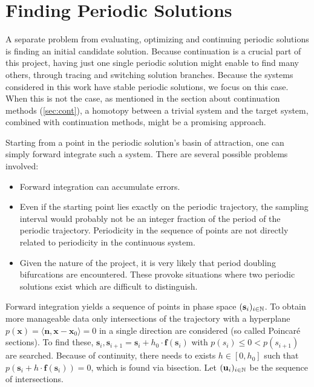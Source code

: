 \section{Finding Periodic Solutions}
\label{sec:initial}

A separate problem from evaluating, optimizing and continuing periodic solutions is finding an initial candidate solution.
Because continuation is a crucial part of this project, having just one single periodic solution might enable to find many others, through tracing and switching solution branches.
Because the systems considered in this work have stable periodic solutions, we focus on this case.
When this is not the case, as mentioned in the section about continuation methods (\autoref{sec:cont}), a homotopy between a trivial system and the target system, combined with continuation methods, might be a promising approach.

Starting from a point in the periodic solution's basin of attraction, one can simply forward integrate such a system.
There are several possible problems involved:
\begin{itemize}
	\item Forward integration can accumulate errors.
	\item Even if the starting point lies exactly on the periodic trajectory, the sampling interval would probably not be an integer fraction of the period of the periodic trajectory.
		Periodicity in the sequence of points are not directly related to periodicity in the continuous system.
	\item Given the nature of the project, it is very likely that period doubling bifurcations are encountered.
		These provoke situations where two periodic solutions exist which are difficult to distinguish.
\end{itemize}

Forward integration yields a sequence of points in phase space $(\textbf{s}_i)_{i \in \mathbb{N}}$.
To obtain more manageable data only intersections of the trajectory with a hyperplane $p(\textbf{x}) = \langle \textbf{n}, \textbf{x}-\textbf{x}_0 \rangle = 0$ in a single direction are considered (so called Poincaré sections).
To find these, $\textbf{s}_i, \textbf{s}_{i+1} = \textbf{s}_i + h_0 \cdot \textbf{f}(\textbf{s}_i)$ with $p(s_i) \le 0 < p(s_{i+1})$ are searched.
Because of continuity, there needs to exists $h \in [0,h_0]$ such that $p(\textbf{s}_i + h \cdot \textbf{f}(\textbf{s}_i)) = 0$, which is found via bisection.
Let $(\textbf{u}_i)_{i \in \mathbb{N}}$ be the sequence of intersections.

